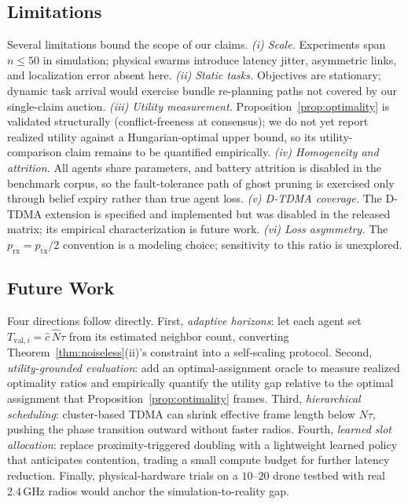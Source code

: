 \subsection{Limitations}
Several limitations bound the scope of our claims.
\emph{(i) Scale.}
Experiments span $n \leq 50$ in simulation; physical swarms introduce latency jitter, asymmetric links, and localization error absent here.
\emph{(ii) Static tasks.}
Objectives are stationary; dynamic task arrival would exercise bundle re-planning paths not covered by our single-claim auction.
\emph{(iii) Utility measurement.}
Proposition~\ref{prop:optimality} is validated structurally (conflict-freeness at consensus); we do not yet report realized utility against a Hungarian-optimal upper bound, so its utility-comparison claim remains to be quantified empirically.
\emph{(iv) Homogeneity and attrition.}
All agents share parameters, and battery attrition is disabled in the benchmark corpus, so the fault-tolerance path of ghost pruning is exercised only through belief expiry rather than true agent loss.
\emph{(v) D-TDMA coverage.}
The D-TDMA extension is specified and implemented but was disabled in the released matrix; its empirical characterization is future work.
\emph{(vi) Loss asymmetry.}
The $p_{\mathrm{rx}} = p_{\mathrm{tx}}/2$ convention is a modeling choice; sensitivity to this ratio is unexplored.

\subsection{Future Work}
Four directions follow directly.
First, \emph{adaptive horizons}: let each agent set $T_{\mathrm{val},i} = \hat{c}\,\widehat{N}\tau$ from its estimated neighbor count, converting Theorem~\ref{thm:noiseless}(ii)'s constraint into a self-scaling protocol.
Second, \emph{utility-grounded evaluation}: add an optimal-assignment oracle to measure realized optimality ratios and empirically quantify the utility gap relative to the optimal assignment that Proposition~\ref{prop:optimality} frames.
Third, \emph{hierarchical scheduling}: cluster-based TDMA can shrink effective frame length below $N\tau$, pushing the phase transition outward without faster radios.
Fourth, \emph{learned slot allocation}: replace proximity-triggered doubling with a lightweight learned policy that anticipates contention, trading a small compute budget for further latency reduction.
Finally, physical-hardware trials on a $10$--$20$ drone testbed with real 2.4\,GHz radios would anchor the simulation-to-reality gap.
